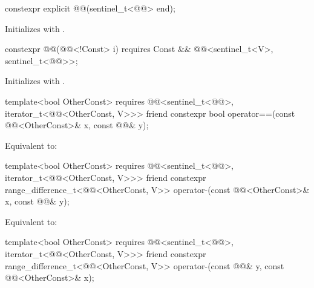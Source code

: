 \begin{itemdecl}
constexpr explicit @@(sentinel_t<@@> end);
\end{itemdecl}

\begin{itemdescr}
\pnum
\effects
Initializes  with .
\end{itemdescr}

\begin{itemdecl}
constexpr @@(@@<!Const> i)
  requires Const && @@<sentinel_t<V>, sentinel_t<@@>>;
\end{itemdecl}

\begin{itemdescr}
\pnum
\effects
Initializes  with .
\end{itemdescr}

\begin{itemdecl}
template<bool OtherConst>
  requires @@<sentinel_t<@@>, iterator_t<@@<OtherConst, V>>>
friend constexpr bool operator==(const @@<OtherConst>& x, const @@& y);
\end{itemdecl}

\begin{itemdescr}
\pnum
\effects
Equivalent to: 
\end{itemdescr}

\begin{itemdecl}
template<bool OtherConst>
  requires @@<sentinel_t<@@>, iterator_t<@@<OtherConst, V>>>
friend constexpr range_difference_t<@@<OtherConst, V>>
  operator-(const @@<OtherConst>& x, const @@& y);
\end{itemdecl}

\begin{itemdescr}
\pnum
\effects
Equivalent to: 
\end{itemdescr}

\begin{itemdecl}
template<bool OtherConst>
  requires @@<sentinel_t<@@>, iterator_t<@@<OtherConst, V>>>
friend constexpr range_difference_t<@@<OtherConst, V>>
  operator-(const @@& y, const @@<OtherConst>& x);
\end{itemdecl}

